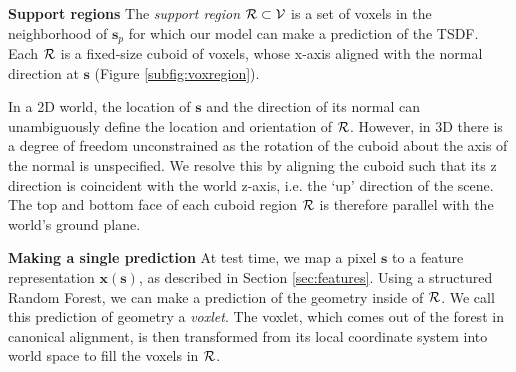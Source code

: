 \documentclass[10pt,twocolumn,letterpaper]{article}
\makeatletter
\renewcommand*{\ie}{i.e.\@\xspace}
\newcommand{\feat}{\mathbf{x}}
\newcommand{\rgbdimage}{\mathcal{D}}
\newcommand{\pixelidx}{\mathbf{s}}
\newcommand{\voxelgrid}{\mathcal{V}}
\newcommand{\project}{\mathbf{p}}
\newcommand{\point}{\mathbf{p}}
\newcommand{\normal}{\mathbf{n}}
\newcommand{\updir}{\mathbf{u}}
\newcommand{\todo}[1]{\textcolor{red}{TODO: #1}}
\newcommand{\remove}[1]{\textcolor{grey}{#1}}
\renewcommand{\paragraph}{\vspace{2pt}\noindent\textbf}
\makeatother
\begin{document}
\paragraph{Support regions}
The \emph{support region} $\voxregion \subset \voxelgrid$ is a set of voxels in the neighborhood of $\pixelidx_p$ for which our model can make a prediction of the TSDF.
Each $\mathcal{R}$ is a fixed-size cuboid of voxels, whose x-axis aligned with the normal direction at $\pixelidx$ (Figure \ref{subfig:voxregion}).

In a 2D world, the location of $\pixelidx$ and the direction of its normal can unambiguously define the location and orientation of $\mathcal{R}$.
However, in 3D there is a degree of freedom unconstrained as the rotation of the cuboid about the axis of the normal is unspecified.
We resolve this by aligning the cuboid such that its z direction is coincident with the world z-axis, \ie the `up' direction of the scene.
The top and bottom face of each cuboid region $\mathcal{R}$ is therefore parallel with the world's ground plane.




\paragraph{Making a single prediction}
At test time, we map a pixel $\pixelidx$ to a feature representation $\feat(\pixelidx)$, as described in Section \ref{sec:features}.
Using a structured Random Forest, we can make a prediction of the geometry inside of $\mathcal{R}$.
We call this prediction of geometry a \emph{voxlet}.
The voxlet, which comes out of the forest in canonical alignment, is then transformed from its local coordinate system into world space to fill the voxels in $\mathcal{R}$.
\end{document}
